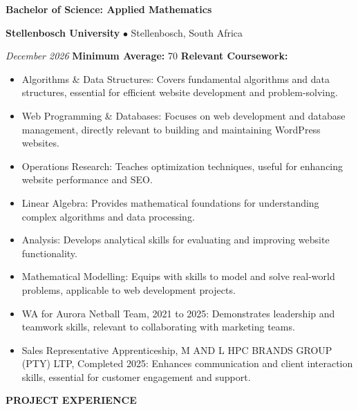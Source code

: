 \documentclass[11pt, a4paper]{article}
\newcommand{\cvsection}[1]{%
  \vspace{6pt}%
  \noindent%
  \colorbox{DKGreen}{\hspace{4pt}\rule{0pt}{14pt}\hspace{4pt}}%
  \colorbox{CardBG}{%
    \parbox[c][14pt]{\dimexpr\linewidth-16pt\relax}{%
      \hspace{8pt}\textcolor{DKGreen}{\textbf{\large\MakeUppercase{#1}}}%
    }%
  }%
  \par
  \noindent{\color{BorderClr}\rule{\linewidth}{0.6pt}}%
  \vspace{4pt}\par\noindent%
}
\newcommand{\sectionrule}{%
  \vspace{2pt}{\color{BorderClr}\rule{\linewidth}{0.6pt}}\vspace{4pt}%
}
\begin{document}
\vspace{6pt}
\noindent\textcolor{DarkTxt}{\textbf{\large Bachelor of Science: Applied Mathematics}}\par
\vspace{2pt}
\noindent\textcolor{MDGreen}{\textbf{Stellenbosch University}}\;
\textcolor{LiteTxt}{$\bullet$\; Stellenbosch, South Africa}\par
\vspace{1pt}
\noindent\textcolor{LiteTxt}{\textit{December 2026}}
\vspace{2pt}
\noindent\textcolor{MidTxt}{\textbf{Minimum Average:}}\;
\textcolor{DKGreen}{70}
\vspace{3pt}
\noindent\textcolor{DKGreen}{\textbf{Relevant Coursework:}}
\sectionrule
\begin{itemize}
  \item \textcolor{MidTxt}{Algorithms \& Data Structures: Covers fundamental algorithms and data structures, essential for efficient website development and problem-solving.}
  \item \textcolor{MidTxt}{Web Programming \& Databases: Focuses on web development and database management, directly relevant to building and maintaining WordPress websites.}
  \item \textcolor{MidTxt}{Operations Research: Teaches optimization techniques, useful for enhancing website performance and SEO.}
  \item \textcolor{MidTxt}{Linear Algebra: Provides mathematical foundations for understanding complex algorithms and data processing.}
  \item \textcolor{MidTxt}{Analysis: Develops analytical skills for evaluating and improving website functionality.}
  \item \textcolor{MidTxt}{Mathematical Modelling: Equips with skills to model and solve real-world problems, applicable to web development projects.}
  \item \textcolor{MidTxt}{WA for Aurora Netball Team, 2021 to 2025: Demonstrates leadership and teamwork skills, relevant to collaborating with marketing teams.}
  \item \textcolor{MidTxt}{Sales Representative Apprenticeship, M AND L HPC BRANDS GROUP (PTY) LTP, Completed 2025: Enhances communication and client interaction skills, essential for customer engagement and support.}
\end{itemize}
\vspace{2pt}

\cvsection{Project Experience}
\end{document}
